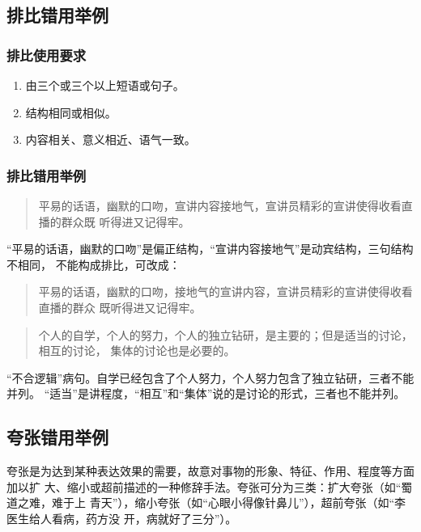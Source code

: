 \documentclass[final,oneside]{ctexbook}
\newenvironment{equotation}{\begin{quotation}\kaishu}{\end{quotation}}
\begin{document}
\subsection{排比错用举例}

\subsubsection{排比使用要求}

\begin{enumerate}
  \item 由三个或三个以上短语或句子。

  \item 结构相同或相似。

  \item 内容相关、意义相近、语气一致。
\end{enumerate}

\subsubsection{排比错用举例}

\begin{equotation}
  平易的话语，幽默的口吻，宣讲内容接地气，宣讲员精彩的宣讲使得收看直播的群众既
  听得进又记得牢。
\end{equotation}

“平易的话语，幽默的口吻”是偏正结构，“宣讲内容接地气”是动宾结构，三句结构不相同，
不能构成排比，可改成：

\begin{equotation}
  平易的话语，幽默的口吻，接地气的宣讲内容，宣讲员精彩的宣讲使得收看直播的群众
  既听得进又记得牢。
\end{equotation}

\begin{equotation}
  个人的自学，个人的努力，个人的独立钻研，是主要的；但是适当的讨论，相互的讨论，
  集体的讨论也是必要的。
\end{equotation}

“不合逻辑”病句。自学已经包含了个人努力，个人努力包含了独立钻研，三者不能并列。
“适当”是讲程度，“相互”和“集体”说的是讨论的形式，三者也不能并列。

\subsection{夸张错用举例}

夸张是为达到某种表达效果的需要，故意对事物的形象、特征、作用、程度等方面加以扩
大、缩小或超前描述的一种修辞手法。夸张可分为三类：扩大夸张（如“蜀道之难，难于上
青天”），缩小夸张（如“心眼小得像针鼻儿”），超前夸张（如“李医生给人看病，药方没
开，病就好了三分”）。
\end{document}
